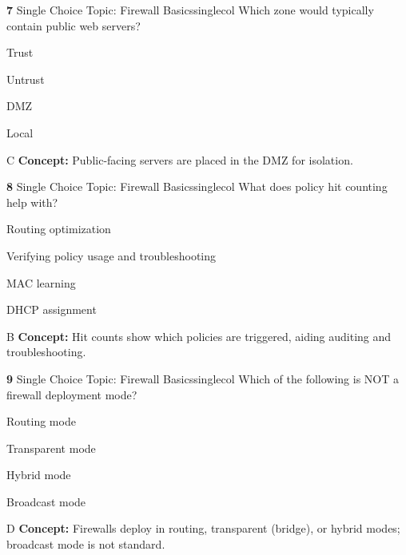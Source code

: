 \documentclass[10pt,a4paper]{article}
\begin{document}
\begin{qcard}{\color{white}\textbf{7} \hfill \small Single Choice \textbar{} Topic: Firewall Basics}{singlecol}
Which zone would typically contain public web servers?

\begin{qoptions}
\item Trust
\item Untrust
\item DMZ
\item Local
\end{qoptions}
\begin{explainbox}{C}
\textbf{Concept:} Public-facing servers are placed in the DMZ for isolation.
\end{explainbox}
\end{qcard}

\begin{qcard}{\color{white}\textbf{8} \hfill \small Single Choice \textbar{} Topic: Firewall Basics}{singlecol}
What does policy hit counting help with?

\begin{qoptions}
\item Routing optimization
\item Verifying policy usage and troubleshooting
\item MAC learning
\item DHCP assignment
\end{qoptions}
\begin{explainbox}{B}
\textbf{Concept:} Hit counts show which policies are triggered, aiding auditing and troubleshooting.
\end{explainbox}
\end{qcard}

\begin{qcard}{\color{white}\textbf{9} \hfill \small Single Choice \textbar{} Topic: Firewall Basics}{singlecol}
Which of the following is NOT a firewall deployment mode?

\begin{qoptions}
\item Routing mode
\item Transparent mode
\item Hybrid mode
\item Broadcast mode
\end{qoptions}
\begin{explainbox}{D}
\textbf{Concept:} Firewalls deploy in routing, transparent (bridge), or hybrid modes; broadcast mode is not standard.
\end{explainbox}
\end{qcard}
\end{document}
